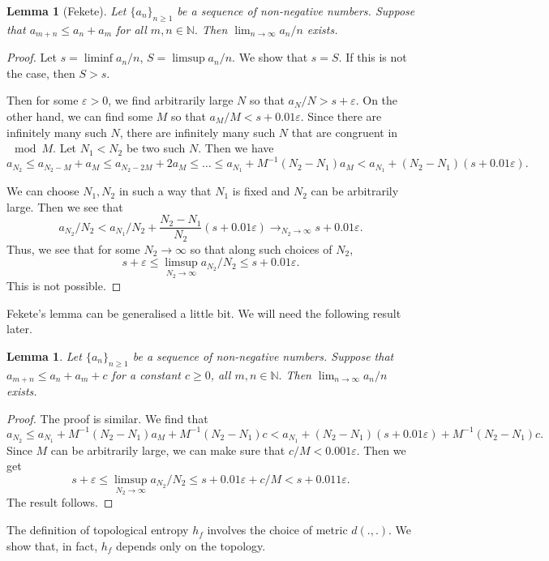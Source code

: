 \documentclass[12pt]{article}
\newtheorem{lemma}[theorem]{Lemma}
\theoremstyle{definition}
\theoremstyle{remark}
\begin{document}
\begin{lemma}[Fekete]\label{lma: Fekete}
    Let $\{a_n\}_{n\geq 1}$ be a sequence of non-negative numbers. Suppose that $a_{m+n}\leq a_n+a_m$ for all $m,n\in\mathbb{N}.$ Then $\lim_{n\to\infty} a_n/n$ exists.
\end{lemma}
\begin{proof}
    Let $s=\liminf a_n/n$, $S=\limsup a_n/n$. We show that $s=S$. If this is not the case, then $S>s$.

    Then for some $\varepsilon>0$, we find arbitrarily large $N$ so that $a_N/N>s+\varepsilon$. On the other hand, we can find some $M$ so that $a_M/M<s+0.01\varepsilon$. Since there are infinitely many such $N$, there are infinitely many such $N$ that are congruent in $\mod M$. Let $N_1<N_2$ be two such $N$. Then we have
    \[
    a_{N_2}\leq a_{N_2-M}+a_M\leq a_{N_2-2M}+2a_M\leq\dots\leq a_{N_1}+M^{-1}(N_2-N_1)a_M<a_{N_1}+(N_2-N_1)(s+0.01\varepsilon).
    \]

    We can choose $N_1,N_2$ in such a way that $N_1$ is fixed and $N_2$ can be arbitrarily large. Then we see that
    \[
    a_{N_2}/N_2<a_{N_1}/N_2+\frac{N_2-N_1}{N_2}(s+0.01\varepsilon)\to_{N_2\to\infty} s+0.01\varepsilon.
    \]
    Thus, we see that for some $N_2\to\infty$ so that along such choices of $N_2$,
    \[
    s+\varepsilon\leq \limsup_{N_2\to\infty}a_{N_2}/N_2\leq s+0.01\varepsilon.
    \]
    This is not possible.
\end{proof}
Fekete's lemma can be generalised a little bit. We will need the following result later.
\begin{lemma}\label{lma: Fekete add constant}
     Let $\{a_n\}_{n\geq 1}$ be a sequence of non-negative numbers. Suppose that $a_{m+n}\leq a_n+a_m+c$ for a constant $c\geq 0$, all $m,n\in\mathbb{N}.$ Then $\lim_{n\to\infty} a_n/n$ exists.
\end{lemma}
\begin{proof}
    The proof is similar. We find that
    \[
    a_{N_2}\leq a_{N_1}+M^{-1}(N_2-N_1)a_M+M^{-1}(N_2-N_1)c<a_{N_1}+(N_2-N_1)(s+0.01\varepsilon)+M^{-1}(N_2-N_1)c.
    \]
    Since $M$ can be arbitrarily large, we can make sure that $c/M<0.001\varepsilon.$ Then we get
    \[
    s+\varepsilon\leq\limsup_{N_2\to\infty}a_{N_2}/N_2\leq s+0.01\varepsilon+c/M<s+0.011\varepsilon.
    \]
    The result follows.
\end{proof}

The definition of topological entropy $h_f$ involves the choice of metric $d(.,.)$. We show that, in fact, $h_f$ depends only on the topology.
\end{document}
